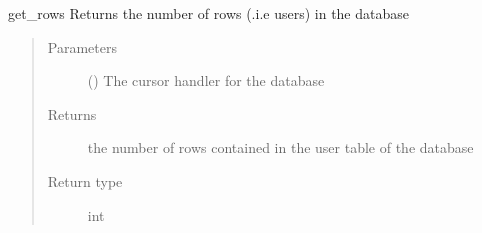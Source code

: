 \documentclass[letterpaper,10pt,english]{sphinxmanual}
\begin{document}

\begin{fulllineitems}
\label{\detokenize{index:data.database.get_rows}}
get\_rows Returns the number of rows (.i.e users) in the database
\begin{quote}\begin{description}
\item[{Parameters}] \leavevmode
{} () \textendash{} The cursor handler for the database

\item[{Returns}] \leavevmode
the number of rows contained in the user table of the database

\item[{Return type}] \leavevmode
int

\end{description}\end{quote}

\end{fulllineitems}

\end{document}
